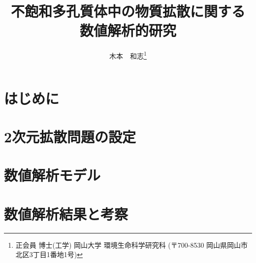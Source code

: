 \documentclass{jsce}
\title{
	不飽和多孔質体中の物質拡散に関する\\数値解析的研究
}
\author{木本　和志\thanks{正会員 博士(工学) 岡山大学 環境生命科学研究科
(〒700-8530 岡山県岡山市北区3丁目1番地1号)
\email{kimoto@cc.okayama-u.ac.jp}}
}
\begin{document}
\maketitle
\section{はじめに}
	
	\vspace{-2mm}
\section{2次元拡散問題の設定}
	
\section{数値解析モデル}
	
\section{数値解析結果と考察}
	
\end{document}

